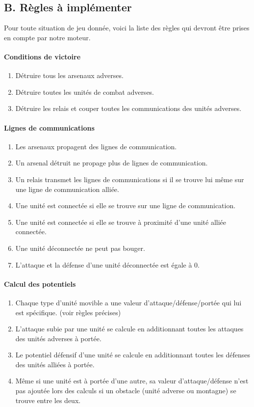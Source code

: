 \documentclass[12pt]{article}
\begin{document}
		\subsection{B. Règles à implémenter}
		Pour toute situation de jeu donnée, voici la liste des règles qui devront être prises en compte par notre moteur.

		\paragraph{Conditions de victoire}
		\begin{enumerate}
		\item Détruire tous les arsenaux adverses.
		\item Détruire toutes les unités de combat adverses.
		\item Détruire les relais et couper toutes les communications des unités adverses.
		\end{enumerate}
		
		\paragraph{Lignes de communications}
		\begin{enumerate}
		\item Les arsenaux propagent des lignes de communication.
		\item Un arsenal détruit ne propage plus de lignes de communication.
		\item Un relais transmet les lignes de communications si il se trouve lui même sur une ligne de communication alliée.
		\item Une unité est connectée si elle se trouve sur une ligne de communication.
		\item Une unité est connectée si elle se trouve à proximité d'une unité alliée connectée.
		\item Une unité déconnectée ne peut pas bouger.
		\item L'attaque et la défense d'une unité déconnectée est égale à 0.
		\end{enumerate}
		
		\paragraph{Calcul des potentiels}
		\begin{enumerate}
		\item Chaque type d'unité movible a une valeur d'attaque/défense/portée qui lui est spécifique. (voir règles précises)
		\item L'attaque subie par une unité se calcule en additionnant toutes les attaques des unités adverses à portée.
		\item Le potentiel défensif d'une unité se calcule en additionnant toutes les défenses des unités alliées à portée.
		\item Même si une unité est à portée d'une autre, sa valeur d'attaque/défense n'est pas ajoutée lors des calculs si un obstacle (unité adverse ou montagne) se trouve entre les deux.
		\end{enumerate}
		
\end{document}
